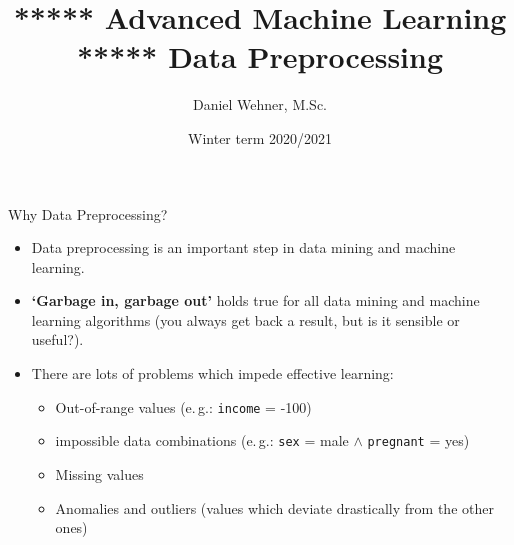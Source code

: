 




\title[Data Preprocessing]{***** Advanced Machine Learning ***** Data Preprocessing}
\author{Daniel Wehner, M.Sc.}
\date{Winter term 2020/2021}




\dwPrintTitle

\dwPrintToc


\begin{dwHeaderFrame}{Why Data Preprocessing?}
	\begin{itemize}
		\item Data preprocessing is an important step in data mining and machine learning.
		\item \textbf{`Garbage in, garbage out'} holds true for all data mining and machine learning algorithms (you always get back a result, but is it sensible or useful?).
		\item There are lots of problems which impede effective learning:
		\begin{itemize}
			\item Out-of-range values (e.\,g.: \texttt{income} = -100)
			\item impossible data combinations (e.\,g.: \texttt{sex} = male $\wedge$ \texttt{pregnant} = yes)
			\item Missing values
			\item Anomalies and outliers (values which deviate drastically from the other ones)
		\end{itemize}
	\end{itemize}
\end{dwHeaderFrame}


